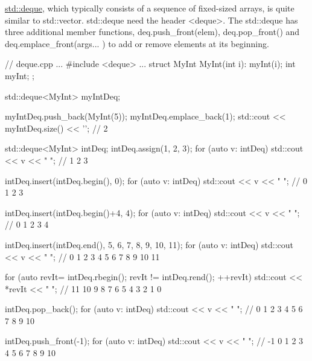 

\href{http://en.cppreference.com/w/cpp/container/deque}{std::deque}, which typically consists of a sequence of fixed-sized arrays, is quite similar to std::vector. std::deque need the header <deque>. The std::deque has three additional member functions, deq.push\_front(elem), deq.pop\_front() and deq.emplace\_front(args... ) to add or remove elements at its beginning.


\begin{cpp}
// deque.cpp
...
#include <deque>
...
struct MyInt{
	MyInt(int i): myInt(i){};
	int myInt;
};

std::deque<MyInt> myIntDeq;

myIntDeq.push_back(MyInt(5));
myIntDeq.emplace_back(1);
std::cout << myIntDeq.size() << '\n'; // 2

std::deque<MyInt> intDeq;
intDeq.assign({1, 2, 3});
for (auto v: intDeq) std::cout << v << " "; // 1 2 3

intDeq.insert(intDeq.begin(), 0);
for (auto v: intDeq) std::cout << v << " "; // 0 1 2 3

intDeq.insert(intDeq.begin()+4, 4);
for (auto v: intDeq) std::cout << v << " "; // 0 1 2 3 4

intDeq.insert(intDeq.end(), {5, 6, 7, 8, 9, 10, 11});
for (auto v: intDeq) std::cout << v << " "; // 0 1 2 3 4 5 6 7 8 9 10 11

for (auto revIt= intDeq.rbegin(); revIt != intDeq.rend(); ++revIt)
	std::cout << *revIt << " "; // 11 10 9 8 7 6 5 4 3 2 1 0

intDeq.pop_back();
for (auto v: intDeq) std::cout << v << " "; // 0 1 2 3 4 5 6 7 8 9 10

intDeq.push_front(-1);
for (auto v: intDeq) std::cout << v << " "; // -1 0 1 2 3 4 5 6 7 8 9 10
\end{cpp}











































